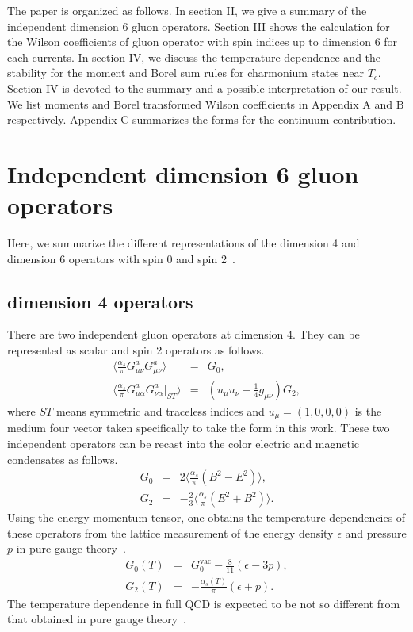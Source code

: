 \documentclass[aps,prc,superscriptaddress,showpacs,floatfix, nofootinbib,preprintnumbers,twocolumn]{revtex4}
\begin{document}
The paper is organized as follows.  
In section II, we give a summary of the independent dimension 6 gluon operators.  
Section III shows the calculation for the Wilson coefficients of gluon operator with spin indices up to dimension 6 for each currents. In section IV, we  discuss the temperature dependence and the stability for the moment and Borel sum rules for charmonium states near $T_c$. Section IV is devoted to the summary and a possible interpretation of our result. We list moments and Borel transformed Wilson coefficients in Appendix A and B respectively. Appendix C summarizes the forms for the continuum contribution.  

\section{Independent dimension 6 gluon operators}

Here, we summarize the different representations of the dimension 4 and dimension 6 operators with spin 0 and spin 2~\cite{Kim:2015xna}. 

\subsection{dimension 4 operators} 

There are two independent gluon operators at dimension 4.  They can be represented as scalar and spin 2 operators as follows\cite{Klingl:1998sr}.
\begin{eqnarray}
\langle \frac{\alpha_s}{\pi}G_{\mu \nu}^aG_{\mu \nu}^a \rangle  & = & G_0 , \nonumber \\ 
\langle \frac{\alpha_s}{\pi} G_{\mu \alpha}^a  G_{\nu  \alpha}^a|_{ST}  \rangle & = & (u_\mu u_\nu -\frac{1}{4} g_{\mu \nu} )G_2 ,
\end{eqnarray}
where $ST$ means symmetric and traceless indices and $u_\mu=(1,0,0,0)$ is the medium four vector taken specifically to take the form in this work.
These two independent operators can be recast into the color electric and magnetic condensates as follows.
\begin{eqnarray}
G_0 & = & 2 \langle \frac{\alpha_s}{\pi}(B^2-E^2) \rangle, \nonumber \\
G_2 & = & -\frac{2}{3} \langle \frac{\alpha_s}{\pi}(E^2+B^2) \rangle. 
\end{eqnarray}
Using the energy momentum tensor, one obtains the temperature dependencies of these operators from the lattice measurement of the energy density $\epsilon$ and pressure $p$ in pure gauge theory~\cite{Lee:2008xp}.
\begin{eqnarray}
G_0(T) & = & G_0^{\text{vac}}-\frac{8}{11} (\epsilon -3p), \nonumber \\
G_2(T) & = &  -\frac{\alpha_s (T)}{\pi}(\epsilon + p).
\end{eqnarray}
The temperature dependence in full QCD is expected to be not so different from that obtained in pure gauge theory~\cite{Morita:2007hv}.
\end{document}
